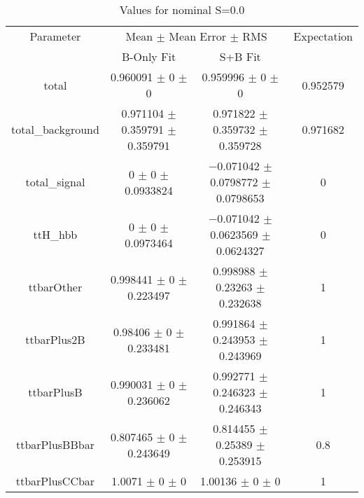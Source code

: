 \begin{table}
\centering
\caption{Values for nominal S=0.0}
\begin{tabular}{cccc}
\toprule
Parameter & \multicolumn{2}{c}{Mean $\pm$ Mean Error $\pm$ RMS} & Expectation\\
 & B-Only Fit & S+B Fit & \\
\midrule
total & \num{0.960091} $\pm$ \num{0} $\pm$ \num{0} & \num{0.959996} $\pm$ \num{0} $\pm$ \num{0} & \num{0.952579}\\
total\_background & \num{0.971104} $\pm$ \num{0.359791} $\pm$ \num{0.359791} & \num{0.971822} $\pm$ \num{0.359732} $\pm$ \num{0.359728} & \num{0.971682}\\
total\_signal & \num{0} $\pm$ \num{0} $\pm$ \num{0.0933824} & \num{-0.071042} $\pm$ \num{0.0798772} $\pm$ \num{0.0798653} & \num{0}\\
ttH\_hbb & \num{0} $\pm$ \num{0} $\pm$ \num{0.0973464} & \num{-0.071042} $\pm$ \num{0.0623569} $\pm$ \num{0.0624327} & \num{0}\\
ttbarOther & \num{0.998441} $\pm$ \num{0} $\pm$ \num{0.223497} & \num{0.998988} $\pm$ \num{0.23263} $\pm$ \num{0.232638} & \num{1}\\
ttbarPlus2B & \num{0.98406} $\pm$ \num{0} $\pm$ \num{0.233481} & \num{0.991864} $\pm$ \num{0.243953} $\pm$ \num{0.243969} & \num{1}\\
ttbarPlusB & \num{0.990031} $\pm$ \num{0} $\pm$ \num{0.236062} & \num{0.992771} $\pm$ \num{0.246323} $\pm$ \num{0.246343} & \num{1}\\
ttbarPlusBBbar & \num{0.807465} $\pm$ \num{0} $\pm$ \num{0.243649} & \num{0.814455} $\pm$ \num{0.25389} $\pm$ \num{0.253915} & \num{0.8}\\
ttbarPlusCCbar & \num{1.0071} $\pm$ \num{0} $\pm$ \num{0} & \num{1.00136} $\pm$ \num{0} $\pm$ \num{0} & \num{1}\\
\bottomrule
\end{tabular}
\end{table}